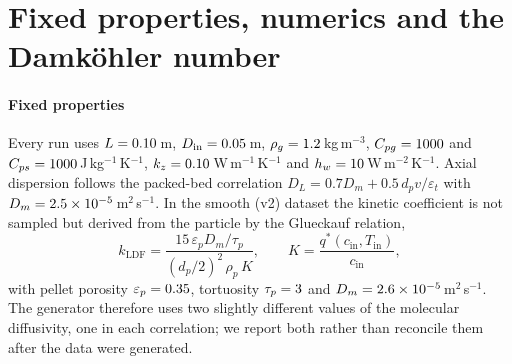 
\section{Fixed properties, numerics and the Damk\"ohler number}

\paragraph{Fixed properties} Every run uses \(L = 0.10\)\,m, \(D_{\mathrm{in}} =
0.05\)\,m, \(\rho_g = 1.2\)\,kg\,m\(^{-3}\), \(C_{pg} = 1000\) and \(C_{ps} =
1000\)\,J\,kg\(^{-1}\)\,K\(^{-1}\), \(k_z = 0.10\)\,W\,m\(^{-1}\)\,K\(^{-1}\) and
\(h_w = 10\)\,W\,m\(^{-2}\)\,K\(^{-1}\). Axial dispersion follows the packed-bed
correlation \(D_L = 0.7D_m + 0.5\,d_p v/\varepsilon_t\) with \(D_m =
2.5\times10^{-5}\)\,m\(^2\)\,s\(^{-1}\). In the smooth (v2) dataset the kinetic
coefficient is not sampled but derived from the particle by the Glueckauf relation,
\begin{equation}
k_{\mathrm{LDF}} = \frac{15\,\varepsilon_p D_m/\tau_p}{(d_p/2)^2\,\rho_p\,K},
\qquad K = \frac{q^{*}(c_{\mathrm{in}},T_{\mathrm{in}})}{c_{\mathrm{in}}},
\label{s2:eq:glueckauf}
\end{equation}
with pellet porosity \(\varepsilon_p = 0.35\), tortuosity \(\tau_p = 3\)
and \(D_m = 2.6\times10^{-5}\)\,m\(^2\)\,s\(^{-1}\). The generator therefore uses
two slightly different values of the molecular diffusivity, one in each correlation;
we report both rather than reconcile them after the data were generated.

